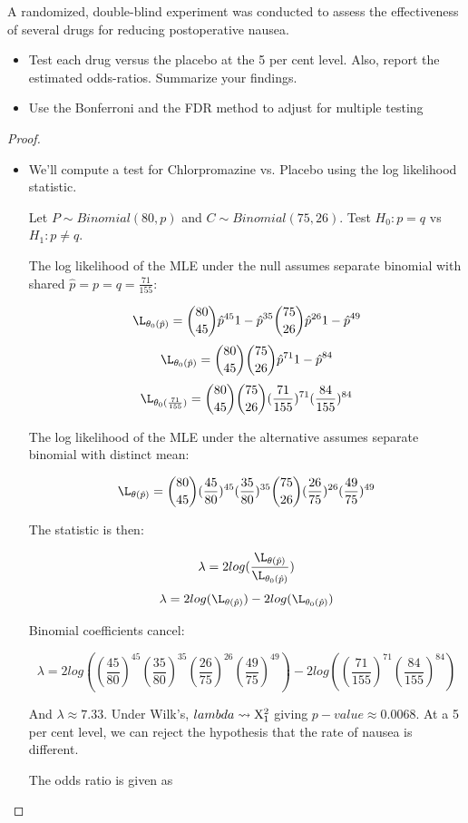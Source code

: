 \documentclass[10pt]{article}
\begin{document}
\setcounter{exercise}{9}
\begin{exercise}
    A randomized, double-blind experiment was conducted to assess the
    effectiveness of several drugs for reducing postoperative nausea.
    \begin{itemize}
        \item{Test each drug versus the placebo at the 5 per cent level. Also,
            report the estimated odds-ratios. Summarize your findings.}
        \item{Use the Bonferroni and the FDR method to adjust for multiple
            testing}
    \end{itemize}
\end{exercise}

\begin{proof}
    \begin{itemize}
        \item{We'll compute a test for Chlorpromazine vs. Placebo using the log
            likelihood statistic.

            Let $P \sim Binomial(80, p)$ and $C \sim Binomial(75, 26)$. Test
            $H_0: p = q$ vs $H_1: p \neq q$. 

            The log likelihood of the MLE under the null assumes separate
            binomial with shared $\hat{p} = p = q = \frac{71}{155}$:

            \[\L_{\theta_0(\hat{p})} =
            \binom{80}{45}{\hat{p}}^{45}{1-\hat{p}}^{35}\binom{75}{26}{\hat{p}}^{26}{1-\hat{p}}^{49} \]
            \[\L_{\theta_0(\hat{p})} = \binom{80}{45}\binom{75}{26}{\hat{p}}^{71}{1-\hat{p}}^{84}\]
            \[\L_{\theta_0(\frac{71}{155})} = \binom{80}{45}\binom{75}{26}(\frac{71}{155})^{71}(\frac{84}{155})^{84}\]

            The log likelihood of the MLE under the alternative assumes
            separate binomial with distinct mean:


            \[\L_{\theta(\hat{p})} = \binom{80}{45}(\frac{45}{80})^{45}(\frac{35}{80})^{35} \binom{75}{26}(\frac{26}{75})^{26}(\frac{49}{75})^{49}\]
        }

            The statistic is then: 

            \[ \lambda = 2log(\frac{\L_{\theta(\hat{p})}}{\L_{\theta_0(\hat{p})}}) \]
            \[ \lambda = 2log(\L_{\theta(\hat{p})}) - 2log(\L_{\theta_0(\hat{p})}) \]

            Binomial coefficients cancel:

            \[ \lambda = 2log((\frac{45}{80})^{45}(\frac{35}{80})^{35}(\frac{26}{75})^{26}(\frac{49}{75})^{49}) - 2log((\frac{71}{155})^{71}(\frac{84}{155})^{84}) \]

            And $\lambda \approx 7.33$. Under Wilk's, $lambda \rightsquigarrow
            \mathrm{X}_1^2$ giving $p-value \approx 0.0068$. At a 5 per cent level,
            we can reject the hypothesis that the rate of nausea is different.

            The odds ratio is given as %
    \end{itemize}
\end{proof}
\end{document}
